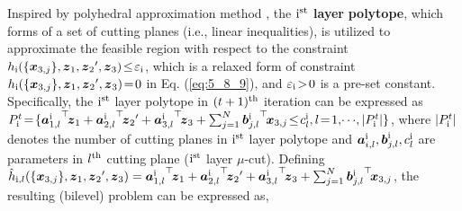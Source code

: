 \documentclass[letterpaper]{article}
\begin{document}
Inspired by polyhedral approximation method \cite{bertsekas2015convex,burger2013polyhedral}, the \textbf{${\rm{\uppercase\expandafter{\romannumeral1}}}^{\rm{st}}$ layer} \textbf{polytope}, which forms of a set of cutting planes (i.e., linear inequalities), is utilized to approximate the feasible region with respect to the constraint $h_{\rm{\uppercase\expandafter{\romannumeral1}}}(\{{\boldsymbol{x}_{3,j}}\},\boldsymbol{z}_1, {\boldsymbol{z}_2}',\boldsymbol{z}_3 )\! \le \! \varepsilon_{\rm{\uppercase\expandafter{\romannumeral1}}}$, which is a relaxed form of constraint $h_{\rm{\uppercase\expandafter{\romannumeral1}}}(\{{\boldsymbol{x}_{3,j}}\},\boldsymbol{z}_1, {\boldsymbol{z}_2}',\boldsymbol{z}_3 )\!=\!0$ in Eq. (\ref{eq:5_8_9}), and $\varepsilon_{\rm{\uppercase\expandafter{\romannumeral1}}}\!>\!0$  is a pre-set constant. Specifically, the ${\rm{\uppercase\expandafter{\romannumeral1}}}^{\rm{st}}$ layer polytope in $(t+1)^{\rm{th}}$ iteration can be expressed as $P_{\rm{\uppercase\expandafter{\romannumeral1}}}^{t}\!=\!\{{\boldsymbol{a}_{1,l}^{\rm{\uppercase\expandafter{\romannumeral1}}}}^{\top}\!{\boldsymbol{z}_1} + {\boldsymbol{a}_{2,l}^{\rm{\uppercase\expandafter{\romannumeral1}}}}^{\top}\!{\boldsymbol{z}_2}' + {\boldsymbol{a}_{3,l}^{\rm{\uppercase\expandafter{\romannumeral1}}}}^{\top}\!{\boldsymbol{z}_3} + \sum\nolimits_{j = 1}^N {\boldsymbol{b}{{_{j,l}^{\rm{\uppercase\expandafter{\romannumeral1}}}}}}^{\top}\!{\boldsymbol{x}_{3,j}}  \!\le\! c_l^{\rm{\uppercase\expandafter{\romannumeral1}}},l \!=\! 1,\! \cdots\! ,|P_{\rm{\uppercase\expandafter{\romannumeral1}}}^{t}| \}$, where $|P_{\rm{\uppercase\expandafter{\romannumeral1}}}^{t}|$ denotes the number of cutting planes in ${\rm{\uppercase\expandafter{\romannumeral1}}}^{\rm{st}}$ layer polytope and ${\boldsymbol{a}_{i,l}^{\rm{\uppercase\expandafter{\romannumeral1}}}}, {\boldsymbol{b}_{j,l}^{\rm{\uppercase\expandafter{\romannumeral1}}}}, {c_{l}^{\rm{\uppercase\expandafter{\romannumeral1}}}}$ are parameters in $l^{\rm{th}}$ cutting plane (${\rm{\uppercase\expandafter{\romannumeral1}}}^{\rm{st}}$ layer $\mu$-cut). Defining $\hat{h}_{{\rm{\uppercase\expandafter{\romannumeral1}}},l}(\{{\boldsymbol{x}_{3,j}}\},\boldsymbol{z}_1, {\boldsymbol{z}_2}',\boldsymbol{z}_3 ) = {\boldsymbol{a}_{1,l}^{\rm{\uppercase\expandafter{\romannumeral1}}}}^{\top}\!{\boldsymbol{z}_1} + {\boldsymbol{a}_{2,l}^{\rm{\uppercase\expandafter{\romannumeral1}}}}^{\top}\!{\boldsymbol{z}_2}' + {\boldsymbol{a}_{3,l}^{\rm{\uppercase\expandafter{\romannumeral1}}}}^{\top}\!{\boldsymbol{z}_3} + \sum\nolimits_{j = 1}^N {\boldsymbol{b}{{_{j,l}^{\rm{\uppercase\expandafter{\romannumeral1}}}}}}^{\top}\!{\boldsymbol{x}_{3,j}} $, the resulting (bilevel) problem can be expressed as,
\end{document}
